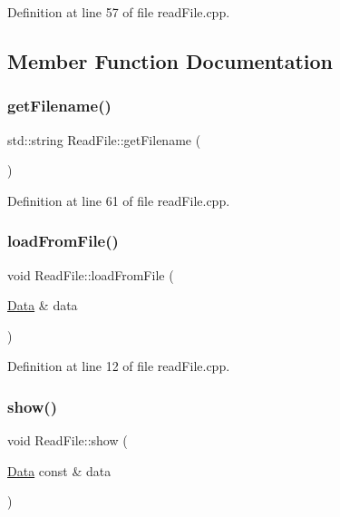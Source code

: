 Definition at line 57 of file read\+File.\+cpp.



\subsection{Member Function Documentation}
\mbox{\label{class_read_file_a9835264c9ec95cfdbc1349573402fc01}} 
\subsubsection{\texorpdfstring{get\+Filename()}{getFilename()}}
{\footnotesize\ttfamily std\+::string Read\+File\+::get\+Filename (\begin{DoxyParamCaption}{ }\end{DoxyParamCaption})}







Definition at line 61 of file read\+File.\+cpp.

\mbox{\label{class_read_file_a232df426223b84e4dbb3f964ee4c3177}} 
\subsubsection{\texorpdfstring{load\+From\+File()}{loadFromFile()}}
{\footnotesize\ttfamily void Read\+File\+::load\+From\+File (\begin{DoxyParamCaption}\item[{\mbox{\hyperlink{struct_data}{Data}} \&}]{data }\end{DoxyParamCaption})}







Definition at line 12 of file read\+File.\+cpp.

\mbox{\label{class_read_file_a5efc41b900510ae038dafc23a2563300}} 
\subsubsection{\texorpdfstring{show()}{show()}}
{\footnotesize\ttfamily void Read\+File\+::show (\begin{DoxyParamCaption}\item[{\mbox{\hyperlink{struct_data}{Data}} const \&}]{data }\end{DoxyParamCaption})}







